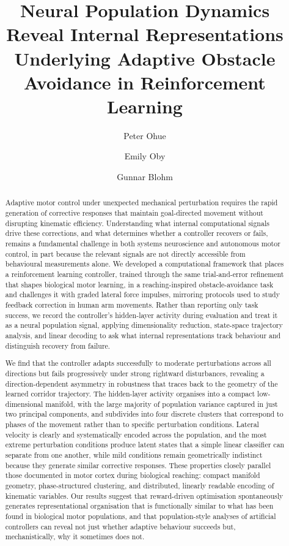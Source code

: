 \documentclass{article}
\title{\textbf{Neural Population Dynamics Reveal Internal Representations
Underlying Adaptive Obstacle Avoidance in Reinforcement Learning}}
\author[1]{Peter Ohue}
\author[1]{Emily Oby}
\author[1,2]{Gunnar Blohm}
\affil[1]{Centre for Neuroscience Studies, Queen's University, ON, Canada}
\affil[2]{Department of Biomedical and Molecular Sciences,
          Queen's University, ON, Canada}
\date{}
\begin{document}
\maketitle

\begin{abstract}

Adaptive motor control under unexpected mechanical perturbation requires the
rapid generation of corrective responses that maintain goal-directed movement
without disrupting kinematic efficiency.
Understanding what internal computational signals drive these corrections, and
what determines whether a controller recovers or fails, remains a fundamental
challenge in both systems neuroscience and autonomous motor control, in part
because the relevant signals are not directly accessible from behavioural
measurements alone.
We developed a computational framework that places a reinforcement learning
controller, trained through the same trial-and-error refinement that shapes
biological motor learning, in a reaching-inspired obstacle-avoidance task and
challenges it with graded lateral force impulses, mirroring protocols used to
study feedback correction in human arm movements.
Rather than reporting only task success, we record the controller's
hidden-layer activity during evaluation and treat it as a neural population
signal, applying dimensionality reduction, state-space trajectory analysis,
and linear decoding to ask what internal representations track behaviour
and distinguish recovery from failure.

We find that the controller adapts successfully to moderate perturbations
across all directions but fails progressively under strong rightward
disturbances, revealing a direction-dependent asymmetry in robustness that
traces back to the geometry of the learned corridor trajectory.
The hidden-layer activity organises into a compact low-dimensional manifold,
with the large majority of population variance captured in just two principal
components, and subdivides into four discrete clusters that correspond to
phases of the movement rather than to specific perturbation conditions.
Lateral velocity is clearly and systematically encoded across the
population, and the most extreme perturbation conditions produce latent
states that a simple linear classifier can separate from one another,
while mild conditions remain geometrically indistinct because they generate
similar corrective responses.
These properties closely parallel those documented in motor cortex during
biological reaching: compact manifold geometry, phase-structured clustering,
and distributed, linearly readable encoding of kinematic variables.
Our results suggest that reward-driven optimisation spontaneously generates
representational organisation that is functionally similar to what has
been found in biological motor populations, and that population-style
analyses of artificial controllers can reveal not just whether adaptive
behaviour succeeds but, mechanistically, why it sometimes does not.

\end{abstract}
\end{document}
